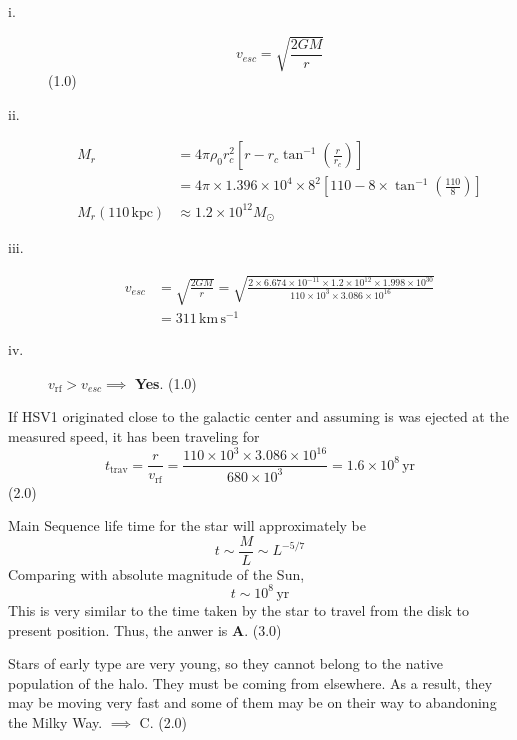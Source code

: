 \begin{description}
\begin{description}
  \item[i.]
    \[
      v_{esc} = \sqrt{\frac{2GM}{r}}
    \]
    \hfill(1.0)
  \item[ii.]
    \begin{align*}
      M_r &= 4\pi\rho_0 r_c^2
        \left[r - r_c\tan^{-1}\left(\frac{r}{r_c}\right)\right]\\
        &= 4\pi\times1.396\times10^{4}\times8^2
        \left[110 - 8\times\tan^{-1}\left(\frac{110}{8}\right)\right]\\
      M_r(110\,\mathrm{kpc}) &\approx 1.2\times10^{12}M_\odot \tag*{(2.0)}
    \end{align*}
  \item[iii.]
    \begin{align*}
      v_{esc} &= \sqrt{\frac{2GM}{r}}
        = \sqrt{\frac{2\times6.674\times10^{-11}\times1.2\times10^{12}
          \times1.998\times10^{30}}{110\times10^{3}\times3.086\times10^{16}}}\\
        &= 311\,\mathrm{km\,s^{-1}} \tag*{(2.0)}
    \end{align*}
  \item[iv.] $v_{\mathrm{rf}} > v_{esc} \implies$ \textbf{Yes}. \hfill(1.0)
  \end{description}
\item[(e)] If HSV1 %
  originated close to the galactic center and assuming is was %
  ejected at the measured speed, it has been traveling for
  \[
    t_{\mathrm{trav}} = \frac{r}{v_{\mathrm{rf}}}
      = \frac{110\times10^{3}\times3.086\times10^{16}}{680\times10^{3}}
      = 1.6\times10^{8}\,\mathrm{yr}
  \]
  \hfill(2.0)
\item[(f)] Main Sequence life time for the star will approximately be
  \[
    t \sim \frac{M}{L} \sim L^{-5/7}
  \]
  Comparing with absolute magnitude of the Sun,
  \[
    t \sim 10^{8}\,\mathrm{yr}
  \]
  This is very similar to the time taken by the star to travel from the disk
  to present position. Thus, the anwer %
  is \textbf{A}. \hfill(3.0)
\item[(g)] Stars of early type are very young, so they cannot belong to the
  native population of the halo. They must be coming from elsewhere. As a
  result, they may be moving very fast and some of them may be on their way
  to abandoning the Milky Way.
  $\implies$ C. \hfill(2.0)
\end{description}

